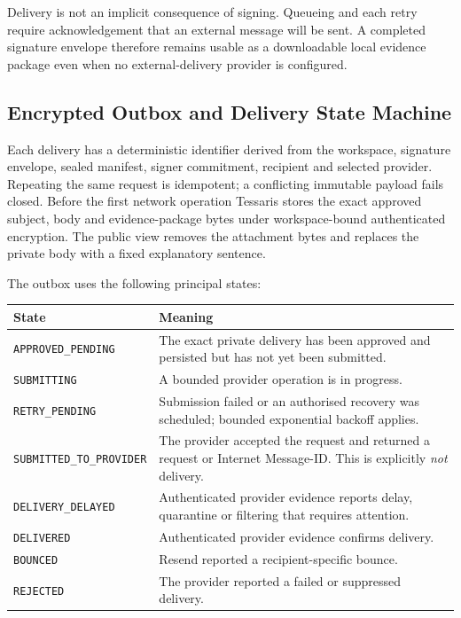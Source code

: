 Delivery is not an implicit consequence of signing.  Queueing and each retry
require acknowledgement that an external message will be sent.  A completed
signature envelope therefore remains usable as a downloadable local evidence
package even when no external-delivery provider is configured.

\subsection{Encrypted Outbox and Delivery State Machine}

Each delivery has a deterministic identifier derived from the workspace,
signature envelope, sealed manifest, signer commitment, recipient and selected
provider.  Repeating the same request is idempotent; a conflicting immutable
payload fails closed.  Before the first network operation Tessaris stores the
exact approved subject, body and evidence-package bytes under workspace-bound
authenticated encryption.  The public view removes the attachment bytes and
replaces the private body with a fixed explanatory sentence.

The outbox uses the following principal states:

\begin{center}
\begin{tabularx}{\textwidth}{@{}lX@{}}
\toprule
\textbf{State} & \textbf{Meaning} \\
\midrule
\texttt{APPROVED\_PENDING} & The exact private delivery has been approved and
persisted but has not yet been submitted. \\
\texttt{SUBMITTING} & A bounded provider operation is in progress. \\
\texttt{RETRY\_PENDING} & Submission failed or an authorised recovery was
scheduled; bounded exponential backoff applies. \\
\texttt{SUBMITTED\_TO\_PROVIDER} & The provider accepted the request and returned
a request or Internet Message-ID.  This is explicitly \emph{not} delivery. \\
\texttt{DELIVERY\_DELAYED} & Authenticated provider evidence reports delay,
quarantine or filtering that requires attention. \\
\texttt{DELIVERED} & Authenticated provider evidence confirms delivery. \\
\texttt{BOUNCED} & Resend reported a recipient-specific bounce. \\
\texttt{REJECTED} & The provider reported a failed or suppressed delivery. \\
\bottomrule
\end{tabularx}
\end{center}

